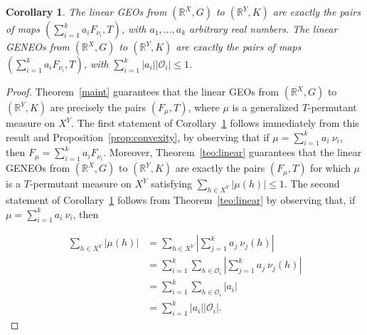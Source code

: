 \documentclass[11pt]{article}
\newcommand{\R}{\mathbb{R}}
\newcommand{\p}{\varphi}
\newtheorem{corollary}[theorem]{Corollary}
\begin{document}
{\begin{corollary}
\label{cor:convexity}
The linear GEOs from $(\R^X,G)$ to $(\R^Y,K)$ are exactly the pairs of maps  
$(\sum_{i=1}^k a_i F_{\nu_i},T)$, with $a_1,\ldots,a_k$ arbitrary real numbers. The linear GENEOs from $(\R^X,G)$ to $(\R^Y,K)$ are exactly the pairs of maps $(\sum_{i=1}^k a_i F_{\nu_i},T)$, with  $\sum_{i=1}^k |a_i||\mathcal{O}_i|\le 1$.
\end{corollary}

\begin{proof}
Theorem~\ref{maint}  guarantees that the linear GEOs from
$(\mathbb{R}^X, G)$ to $(\mathbb{R}^Y, K)$ are precisely the pairs
$(F_\mu, T)$, where $\mu$ is a generalized $T$-permutant measure on $X^Y$.
The first statement of Corollary~\ref{cor:convexity} follows immediately from
this result and Proposition~\ref{prop:convexity}, by observing that if
$\mu = \sum_{i=1}^k a_i \ \nu_i$, then
$F_\mu = \sum_{i=1}^k a_i F_{\nu_i}$.
Moreover, Theorem~\ref{teo:linear} guarantees that the linear GENEOs from
$(\mathbb{R}^X, G)$ to $(\mathbb{R}^Y, K)$ are exactly the pairs
$(F_\mu, T)$ for which $\mu$ is a $T$-permutant measure on $X^Y$
satisfying $\sum_{h \in X^Y} |\mu(h)| \le 1$. The second statement of Corollary~\ref{cor:convexity}
follows from Theorem~\ref{teo:linear} by observing that, if $\mu=\sum_{i=1}^k a_i \ \nu_i$, then 

\[
\begin{aligned}
\sum_{h\in X^Y} |\mu(h)|
&=
\sum_{h\in X^Y} \left|\sum_{j=1}^k a_j \ \nu_j(h)\right|\\
&=\sum_{i=1}^k \sum_{h\in \mathcal{O}_i} \left|\sum_{j=1}^k a_j \ \nu_j(h)\right|\\
&=\sum_{i=1}^k \sum_{h\in \mathcal{O}_i} \left|a_i \right|\\
&=\sum_{i=1}^k |a_i| |\mathcal{O}_i|.
\end{aligned}
\]


\end{proof}}
\end{document}
